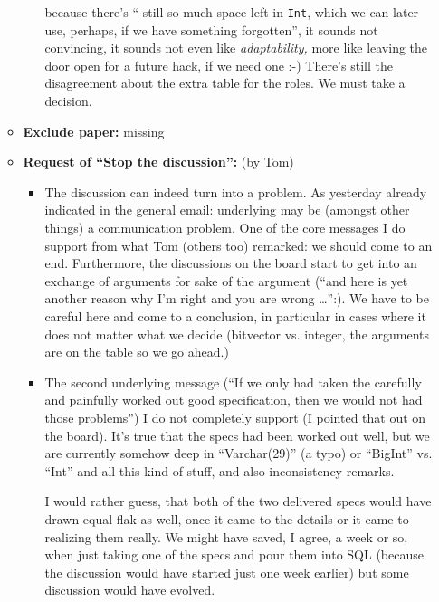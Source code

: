 \documentclass[11pt,handout,nologo]{handout}
\begin{document}
\begin{itemize}
\begin{itemize}
\begin{itemize}
    because there's `` still so much space left in \texttt{Int}, which we can
    later use, perhaps, if we have something forgotten'', it sounds not
    convincing, it sounds not even like \emph{adaptability,} more like leaving
    the door open for a future hack, if we need one :-) There's still the
    disagreement about the extra table for the roles. We must take a decision.
  \end{itemize}
\item\textbf{Exclude paper:} missing
  \end{itemize}
\fi
\begin{itemize}
\item \textbf{Request of ``Stop the discussion'':} (by Tom)
  \begin{itemize}
  \item The discussion can indeed turn into a problem. As yesterday already
    indicated in the general email: underlying may be (amongst other
    things) a communication problem. One of the core messages I do support
    from what Tom (others too) remarked: we should come to an end.
    Furthermore, the discussions on the board start to get into an exchange
    of arguments for sake of the argument (``and here is yet another reason
    why I'm right and you are wrong \ldots'':). We have to be careful here
    and come to a conclusion, in particular in cases where it does not
    matter what we decide (bitvector vs. integer, the arguments are on the
    table so we go ahead.)
  \item The second underlying message (``If we only had taken the carefully
    and painfully worked out good specification, then we would not had
    those problems'') I do not completely support (I pointed that out on
    the board). It's true that the specs had been worked out well, but we
    are currently somehow deep in ``Varchar(29)'' (a typo) or ``BigInt''
    vs. ``Int'' and all this kind of stuff, and also inconsistency remarks.
    
    I would rather guess, that both of the two delivered specs would have
    drawn equal flak as well, once it came to the details or it came to
    realizing them really. We might have saved, I agree, a week or so, when
    just taking one of the specs and pour them into SQL (because the
    discussion would have started just one week earlier) but some discussion
    would have evolved.  
    

\end{itemize}
\end{itemize}
\end{itemize}
\end{document}
